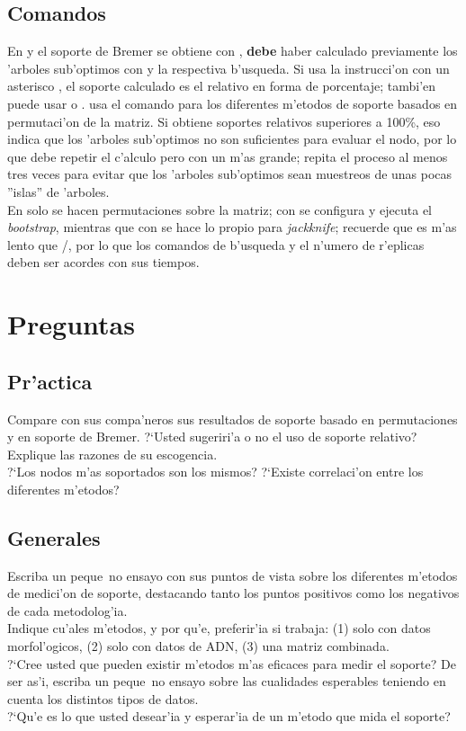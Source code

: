\subsection{Comandos}
En  y  el soporte de Bremer se obtiene con , \textbf{debe} haber calculado previamente los 'arboles  sub'optimos con  y la respectiva b'usqueda. Si usa la instrucci'on con un asterisco , el soporte calculado es el relativo en forma de porcentaje; tambi'en puede usar \Cmd{bsupport [;} o \Cmd{bsupport ];}.  usa el comando  para los diferentes m'etodos de soporte basados en permutaci'on de la matriz. Si obtiene soportes relativos superiores a 100\%, eso indica que los 'arboles sub'optimos no son suficientes para evaluar el nodo, por lo que debe repetir el c'alculo pero con un  m'as grande; repita el proceso al menos tres veces para evitar que los 'arboles sub'optimos sean muestreos de unas pocas ''islas'' de 'arboles.\\
En  solo se hacen permutaciones sobre la matriz; con  se configura y ejecuta el \textit{bootstrap}, mientras que con   se hace lo propio para \textit{jackknife}; recuerde que  es m'as lento que /, por lo que los comandos de b'usqueda y el n'umero de r'eplicas deben ser acordes con sus tiempos.
\section{Preguntas}
\subsection{Pr'actica}
\noindent
Compare con sus compa'neros sus resultados de soporte basado en permutaciones y en soporte de Bremer. ?`Usted sugeriri'a o no el uso de soporte relativo? Explique las razones de su escogencia.\\
?`Los nodos m'as soportados son los mismos? ?`Existe correlaci'on entre los diferentes m'etodos?
\subsection{Generales}
\noindent
Escriba un peque~no ensayo con sus puntos de vista sobre los diferentes m'etodos de medici'on de soporte, destacando tanto los puntos positivos como los negativos de cada metodolog'ia.\\
Indique cu'ales m'etodos, y por qu'e, preferir'ia si trabaja: (1) solo con datos morfol'ogicos, (2) solo con datos de ADN, (3) una matriz combinada.\\
?`Cree usted que pueden existir m'etodos m'as eficaces para medir el soporte? De ser as'i, escriba un peque~no ensayo sobre las cualidades esperables teniendo en cuenta los distintos tipos de datos.\\
?`Qu'e es lo que usted desear'ia y esperar'ia de un m'etodo que mida el soporte?
